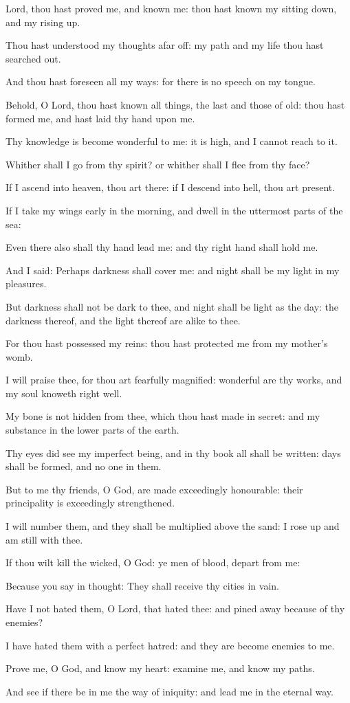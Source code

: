 \item Lord, thou hast proved me, and known me: thou hast known my sitting down, and my rising up.
\item Thou hast understood my thoughts afar off: my path and my life thou hast searched out.
\item And thou hast foreseen all my ways: for there is no speech on my tongue.
\item Behold, O Lord, thou hast known all things, the last and those of old: thou hast formed me, and hast laid thy hand upon me.
\item Thy knowledge is become wonderful to me: it is high, and I cannot reach to it.
\item Whither shall I go from thy spirit? or whither shall I flee from thy face?
\item If I ascend into heaven, thou art there: if I descend into hell, thou art present.
\item If I take my wings early in the morning, and dwell in the uttermost parts of the sea:
\item Even there also shall thy hand lead me: and thy right hand shall hold me.
\item And I said: Perhaps darkness shall cover me: and night shall be my light in my pleasures.
\item But darkness shall not be dark to thee, and night shall be light as the day: the darkness thereof, and the light thereof are alike to thee.
\item For thou hast possessed my reins: thou hast protected me from my mother’s womb.
\item I will praise thee, for thou art fearfully magnified: wonderful are thy works, and my soul knoweth right well.
\item My bone is not hidden from thee, which thou hast made in secret: and my substance in the lower parts of the earth.
\item Thy eyes did see my imperfect being, and in thy book all shall be written: days shall be formed, and no one in them.
\item But to me thy friends, O God, are made exceedingly honourable: their principality is exceedingly strengthened.
\item I will number them, and they shall be multiplied above the sand: I rose up and am still with thee.
\item If thou wilt kill the wicked, O God: ye men of blood, depart from me:
\item Because you say in thought: They shall receive thy cities in vain.
\item Have I not hated them, O Lord, that hated thee: and pined away because of thy enemies?
\item I have hated them with a perfect hatred: and they are become enemies to me.
\item Prove me, O God, and know my heart: examine me, and know my paths.
\item And see if there be in me the way of iniquity: and lead me in the eternal way.